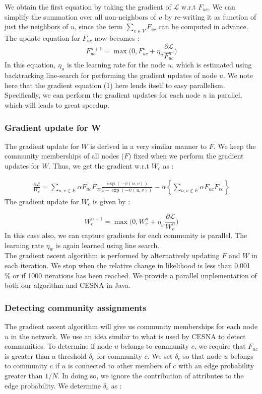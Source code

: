 \documentclass[11pt]{article}
\begin{document}
We obtain the first equation by taking the gradient of $\mathcal{L}$ w.r.t $F_{uc}$. We can simplify the summation over all non-neighbors of $u$ by re-writing it as function of just the neighbors of $u$, since the term $\sum\limits_{v \in V} F_{vc}$ can be computed in advance. The update equation for $F_{uc}$ now becomes : 
\begin{equation}
 F_{uc}^{n+1} =  \max \Big(0, F_{uc}^n  + \eta_u \frac{\partial \mathcal{L}}{F_{uc}^n}\Big) 
\end{equation}
In this equation, $\eta_{u}$ is the learning rate for the node $u$, which is estimated using backtracking line-search \cite{boyd} for performing the gradient updates of node $u$. We note here that the gradient equation (1) here lends itself to easy parallelism. Specifically, we can perform the gradient updates for each node $u$ in parallel, which will leads to great speedup. 
\subsubsection*{Gradient update for W}
The gradient update for $W$ is derived in a very similar manner to $F$. We keep the community memberships of all nodes ($F$) fixed when we perform the gradient updates for $W$. Thus, we get the gradient w.r.t $W_c$ as : 

\begin{align*}
\frac{\partial \mathcal{L}}{W_{c}}  = \sum\limits_{u,v \in E}  \alpha F_{uc} F_{vc} \frac{\exp(- \psi(u,v))}{1 - \exp(-\psi(u,v))} -  \alpha \left\lbrace \sum\limits_{u, v \notin E} \alpha F_{uc} F_{vc} \right\rbrace
\end{align*}
The gradient update for $W_c$ is given by : 

\begin{equation}
W_{c}^{n+1} =  \max \Big(0, W_{c}^n  + \eta_w \frac{\partial \mathcal{L}}{W_{c}^n}\Big) 
\end{equation}
In this case also, we can capture gradients  for each community is parallel.  The learning rate $\eta_w$ is again learned using line search. \\[3pt]
The gradient ascent algorithm is performed by alternatively updating $F$ and $W$ in each iteration.  We stop when the relative change in likelihood is less than 0.001 \% or if 1000 iterations has been reached. We provide a parallel implementation of both our algorithm and CESNA in Java. 
\subsubsection*{Detecting community assignments}
The gradient ascent algorithm will give us community memberships for each node $u$ in the network. We use an idea similar to what is used by CESNA to detect communities. To determine if node $u$ belongs to community $c$, we require that $F_{uc}$ is greater than a threshold $\delta_c$ for community $c$. We set $\delta_c$ so that node $u$ belongs to community $c$ if $u$ is connected to other members of $c$ with an edge probability greater than $1/N$. In doing so, we ignore the contribution of attributes to the edge probability. 
We determine $\delta_c$ as : 
\end{document}
